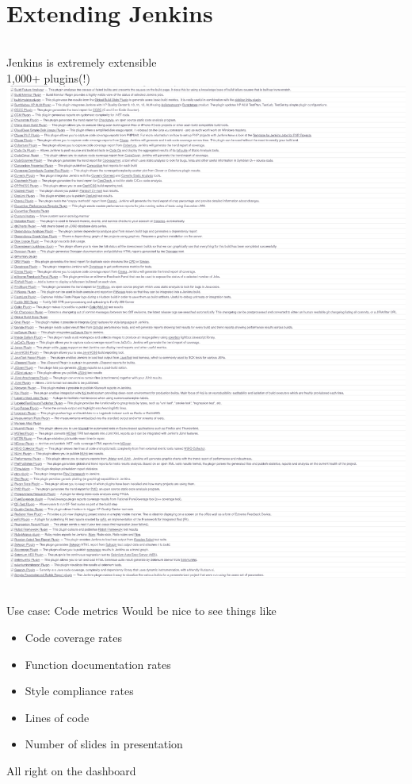\documentclass[xcolor=svgnames,17pt]{beamer}
\begin{document}
\section{Extending Jenkins}

\begin{frame}[plain]{}
\tableofcontents[currentsection]
\end{frame}

\begin{frame}[plain]{}
\begin{columns}
Jenkins is extremely extensible \\
\vspace*{\baselineskip}
1,000+ plugins(!)
\includegraphics[height=\paperheight]{plugin-list.png}
\end{columns}
\end{frame}

\begin{frame}{Use case: Code metrics}
Would be nice to see things like
\begin{itemize}
\item Code coverage rates
\item Function documentation rates
\item Style compliance rates
\item Lines of code
\item Number of slides in presentation
\end{itemize}
All right on the dashboard
\end{frame}
\end{document}
